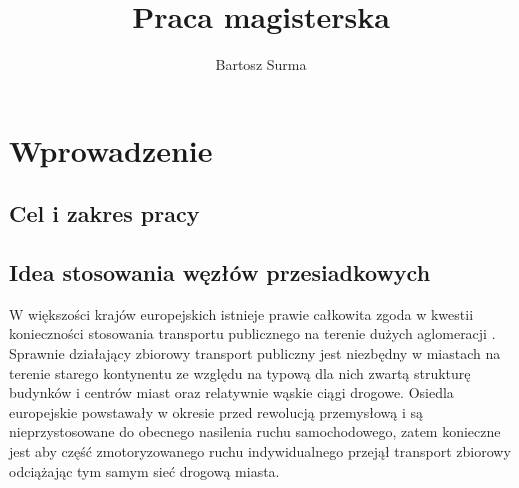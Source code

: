 \documentclass[twoside,12pt]{article}
\title{Praca magisterska}
\author{Bartosz Surma}
\date{}
\begin{document}

%
	
	\tableofcontents
	\clearpage
	\pagestyle{fancy}

\newcommand{\pnr}{,,Park and Ride''}
\newcommand{\obraz}[4]{	
	\begin{figure}[H]
		\centering
		\caption{#1}
		\texttt{[image: \#2]}\\
		\footnotesize{#3}
		{#4}
	\end{figure}
}

\section{Wprowadzenie}

	\subsection{Cel i zakres pracy}

	\subsection{Idea stosowania węzłów przesiadkowych}
	
	W większości krajów europejskich istnieje prawie całkowita zgoda w kwestii konieczności stosowania transportu publicznego na terenie dużych aglomeracji \cite{guide}. Sprawnie działający zbiorowy transport publiczny jest niezbędny w miastach na terenie starego kontynentu ze względu na typową dla nich zwartą strukturę budynków i centrów miast oraz relatywnie wąskie ciągi drogowe. Osiedla europejskie powstawały w okresie przed rewolucją przemysłową i są nieprzystosowane do obecnego nasilenia ruchu samochodowego, zatem konieczne jest aby część zmotoryzowanego ruchu indywidualnego przejął transport zbiorowy odciążając tym samym sieć drogową miasta. 
	
\end{document}
